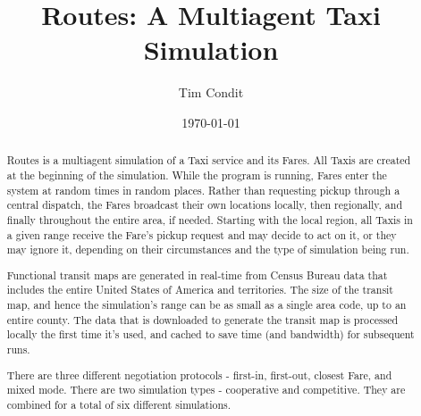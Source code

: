 \documentclass[11pt,letterpaper,onecolumn,twoside,openright,draft]{report}
\begin{document}
\title{Routes: A Multiagent Taxi Simulation}
\author{Tim Condit}
\date{\today}
\maketitle
\thispagestyle{empty}


\pagestyle{headings}
\setcounter{page}{1}

\tableofcontents
{}
\listoffigures
\listoftables


\begin{abstract}
Routes is a multiagent simulation of a Taxi service and its Fares.
All Taxis are created at the beginning of the simulation.
While the program is running, Fares enter the system at random times in random places.
Rather than requesting pickup through a central dispatch, the Fares broadcast their own locations locally, then regionally, and finally throughout the entire area, if needed.
Starting with the local region, all Taxis in a given range receive the Fare's pickup request and may decide to act on it, or they may ignore it, depending on their circumstances and the type of simulation being run.

Functional transit maps are generated in real-time from Census Bureau data that includes the entire United States of America and territories.
The size of the transit map, and hence the simulation's range can be as small as a single area code, up to an entire county.
The data that is downloaded to generate the transit map is processed locally the first time it's used, and cached to save time (and bandwidth) for subsequent runs.


There are three different negotiation protocols - first-in, first-out, closest Fare, and mixed mode.
There are two simulation types - cooperative and competitive.
They are combined for a total of six different simulations.
\end{abstract}
\end{document}
